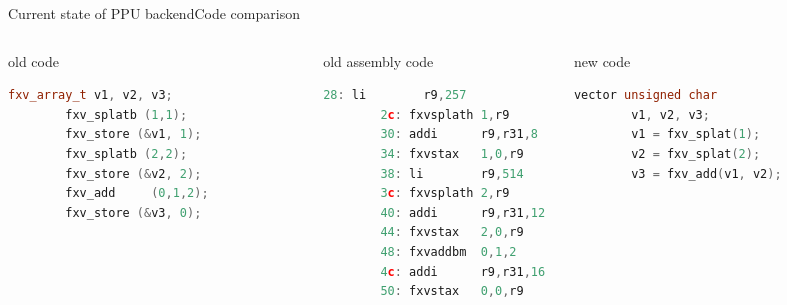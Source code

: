 \documentclass[10pt]{beamer}
\begin{document}
\begin{frame}[fragile]{Current state of PPU backend}{Code comparison}
\begin{columns}[t]
   \begin{column}{0.3\textwidth}
      \begin{block}{old code}
      \begin{lstlisting}[language=C++,basicstyle=\ttfamily\scriptsize,keywordstyle=\color{red}]
		fxv_array_t v1, v2, v3;
		fxv_splatb (1,1);
		fxv_store (&v1, 1);
		fxv_splatb (2,2);
		fxv_store (&v2, 2);
		fxv_add 	(0,1,2);
		fxv_store (&v3, 0);				
	\end{lstlisting}
      \end{block}
    \end{column}    
    \begin{column}{0.3\textwidth}
      \begin{block}{old assembly code}
        \begin{lstlisting}[language=C++,basicstyle=\ttfamily\scriptsize,keywordstyle=\color{red}]
		28: li        r9,257
		2c: fxvsplath 1,r9
		30: addi      r9,r31,8
		34: fxvstax   1,0,r9
		38: li        r9,514
		3c: fxvsplath 2,r9
		40: addi      r9,r31,12
		44: fxvstax   2,0,r9
		48: fxvaddbm  0,1,2
		4c: addi      r9,r31,16
		50: fxvstax   0,0,r9

	\end{lstlisting}
      \end{block}
    \end{column}
    \begin{column}{0.3\textwidth}
      \begin{block}{new code}
        \begin{lstlisting}[language=C++,basicstyle=\ttfamily\scriptsize,keywordstyle=\color{red}]
		vector unsigned char
		v1, v2, v3;
		v1 = fxv_splat(1);
		v2 = fxv_splat(2);	
		v3 = fxv_add(v1, v2);			
	\end{lstlisting}
      \end{block}
    \end{column}
\end{columns}
\end{frame}
\end{document}
